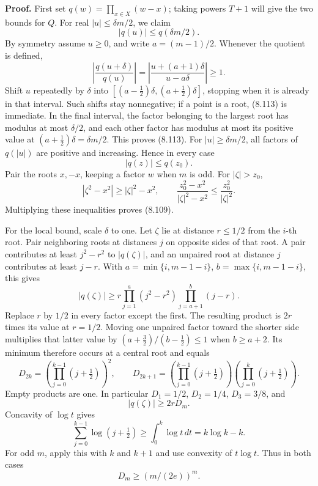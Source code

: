 \documentclass[
  11pt,
  a4paper,
]{article}
\begin{document}
\textbf{Proof.} First set \(q(w)=\prod_{x\in X}(w-x)\); taking powers
\(T+1\) will give the two bounds for \(Q\). For real
\(|u|\le\delta m/2\), we claim \[
|q(u)|\le q(\delta m/2).
\tag{8.113}
\] By symmetry assume \(u\ge0\), and write \(a=(m-1)/2\). Whenever the
quotient is defined, \[
\left|\frac{q(u+\delta)}{q(u)}\right|
=\left|\frac{u+(a+1)\delta}{u-a\delta}\right|\ge1.
\] Shift \(u\) repeatedly by \(\delta\) into
\([(a-\tfrac12)\delta,(a+\tfrac12)\delta]\), stopping when it is already
in that interval. Such shifts stay nonnegative; if a point is a root,
(8.113) is immediate. In the final interval, the factor belonging to the
largest root has modulus at most \(\delta/2\), and each other factor has
modulus at most its positive value at \((a+\tfrac12)\delta=\delta m/2\).
This proves (8.113). For \(|u|\ge\delta m/2\), all factors of \(q(|u|)\)
are positive and increasing. Hence in every case \[
|q(z)|\le q(z_0).
\] Pair the roots \(x,-x\), keeping a factor \(w\) when \(m\) is odd.
For \(|\zeta|>z_0\), \[
|\zeta^2-x^2|\ge|\zeta|^2-x^2,\qquad
\frac{z_0^2-x^2}{|\zeta|^2-x^2}
\le\frac{z_0^2}{|\zeta|^2}.
\] Multiplying these inequalities proves (8.109).

For the local bound, scale \(\delta\) to one. Let \(\zeta\) lie at
distance \(r\le1/2\) from the \(i\)-th root. Pair neighboring roots at
distances \(j\) on opposite sides of that root. A pair contributes at
least \(j^2-r^2\) to \(|q(\zeta)|\), and an unpaired root at distance
\(j\) contributes at least \(j-r\). With \(a=\min\{i,m-1-i\}\),
\(b=\max\{i,m-1-i\}\), this gives \[
|q(\zeta)|\ge
r\prod_{j=1}^{a}(j^2-r^2)\prod_{j=a+1}^{b}(j-r).
\] Replace \(r\) by \(1/2\) in every factor except the first. The
resulting product is \(2r\) times its value at \(r=1/2\). Moving one
unpaired factor toward the shorter side multiplies that latter value by
\((a+\tfrac32)/(b-\tfrac12)\le1\) when \(b\ge a+2\). Its minimum
therefore occurs at a central root and equals \[
D_{2k}=\left(\prod_{j=0}^{k-1}(j+\tfrac12)\right)^2,\qquad
D_{2k+1}=
\left(\prod_{j=0}^{k-1}(j+\tfrac12)\right)
\left(\prod_{j=0}^{k}(j+\tfrac12)\right).
\tag{8.114}
\] Empty products are one. In particular \(D_1=1/2\), \(D_2=1/4\),
\(D_3=3/8\), and \[
|q(\zeta)|\ge2rD_m.
\tag{8.115}
\] Concavity of \(\log t\) gives \[
\sum_{j=0}^{k-1}\log(j+\tfrac12)
\ge\int_0^k\log t\,dt=k\log k-k.
\] For odd \(m\), apply this with \(k\) and \(k+1\) and use convexity of
\(t\log t\). Thus in both cases \[
D_m\ge(m/(2e))^m.
\tag{8.116}
\]
\end{document}

